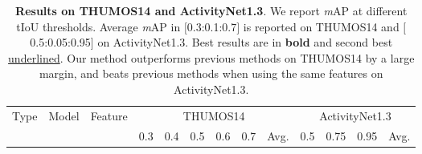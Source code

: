 \begin{table}[t]
 \centering
 \caption{\label{tab:result_thumosandanet} \textbf{Results on THUMOS14 and ActivityNet1.3}. We report \textit{m}AP at different tIoU thresholds. Average \textit{m}AP in $[$0.3:0.1:0.7$]$ is reported on THUMOS14 and $[$0.5:0.05:0.95$]$ on ActivityNet1.3. Best results are in \textbf{bold} and second best \underline{underlined}. Our method outperforms previous methods on THUMOS14 by a large margin, and beats previous methods when using the same features on ActivityNet1.3.}
 \resizebox{1.0\textwidth}{!}
 {
  \setlength{\tabcolsep}{2.5pt}
  \begin{tabular}{c|l|c|cccccc|cccc}
 \multirow{2}{*}{Type} & \multirow{2}{*}{Model} & \multirow{2}{*}{Feature} & \multicolumn{6}{c}{THUMOS14} & \multicolumn{4}{c}{ActivityNet1.3}\tabularnewline
 \cline{4-13}
& & & 0.3 & 0.4 & 0.5 & 0.6  & 0.7 & Avg. & 0.5 & 0.75 & 0.95 & Avg.\\


\end{tabular}}
\end{table}
